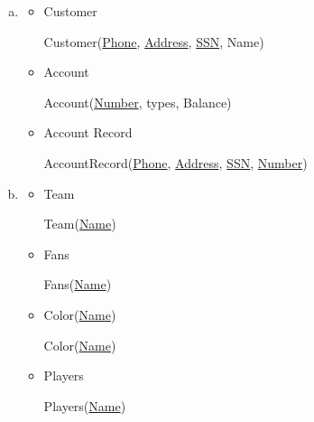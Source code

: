 \documentclass[12pt]{article}
\begin{document}
\begin{enumerate}[1.]
\begin{enumerate}[a)]
        \item


        \begin{itemize}
            \item Customer

            \bigskip

            \quad Customer(\underline{Phone}, \underline{Address}, \underline{SSN}, Name)

            \bigskip

            \item Account

            \bigskip

            \quad Account(\underline{Number}, types, Balance)

            \bigskip

            \item Account Record

            \bigskip

            \quad AccountRecord(\underline{Phone}, \underline{Address}, \underline{SSN}, \underline{Number})

            \bigskip
        \end{itemize}

        \item

        \begin{itemize}
            \item Team

            \bigskip

            \quad Team(\underline{Name})

            \bigskip

            \item Fans

            \bigskip

            \quad Fans(\underline{Name})

            \bigskip

            \item Color(\underline{Name})

            \bigskip

            \quad Color(\underline{Name})

            \bigskip

            \item Players

            \bigskip

            \quad Players(\underline{Name})


\end{itemize}
\end{enumerate}
\end{enumerate}
\end{document}
